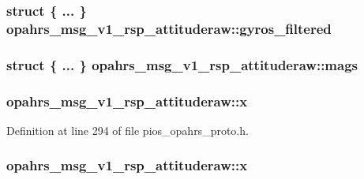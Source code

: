 \hypertarget{structopahrs__msg__v1__rsp__attituderaw_a9a702eb090e1d66dd744d0927313fefd}{
\subsubsection[{gyros\-\_\-filtered}]{\setlength{\rightskip}{0pt plus 5cm}struct \{ ... \}   opahrs\-\_\-msg\-\_\-v1\-\_\-rsp\-\_\-attituderaw\-::gyros\-\_\-filtered}}\label{structopahrs__msg__v1__rsp__attituderaw_a9a702eb090e1d66dd744d0927313fefd}
\hypertarget{structopahrs__msg__v1__rsp__attituderaw_a54ea363b8dbcb11432882768394f38d5}{
\subsubsection[{mags}]{\setlength{\rightskip}{0pt plus 5cm}struct \{ ... \}   opahrs\-\_\-msg\-\_\-v1\-\_\-rsp\-\_\-attituderaw\-::mags}}\label{structopahrs__msg__v1__rsp__attituderaw_a54ea363b8dbcb11432882768394f38d5}
\hypertarget{structopahrs__msg__v1__rsp__attituderaw_a07a09e0f4ad188bb8cd0a320474e7a01}{
\subsubsection[{x}]{ opahrs\-\_\-msg\-\_\-v1\-\_\-rsp\-\_\-attituderaw\-::x}}\label{structopahrs__msg__v1__rsp__attituderaw_a07a09e0f4ad188bb8cd0a320474e7a01}


Definition at line 294 of file pios\-\_\-opahrs\-\_\-proto.\-h.

\hypertarget{structopahrs__msg__v1__rsp__attituderaw_a994d9ef426987b507ca1b3e187a1850d}{
\subsubsection[{x}]{ opahrs\-\_\-msg\-\_\-v1\-\_\-rsp\-\_\-attituderaw\-::x}}\label{structopahrs__msg__v1__rsp__attituderaw_a994d9ef426987b507ca1b3e187a1850d}


